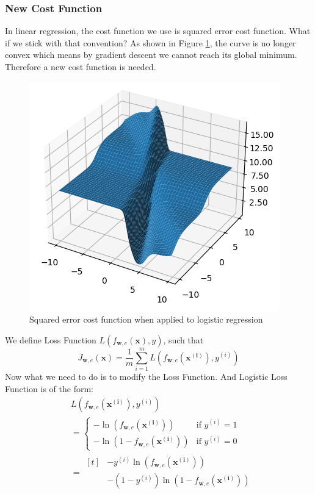 \documentclass[12pt, twoside]{article}
\begin{document}
\begin{multicols*}{2}
		\subsubsection{New Cost Function}
		In linear regression, the cost function we use is squared error cost function. What if we stick with that convention? As shown in Figure \ref{fig:cost-nonconvex}, the curve is no longer convex which means by gradient descent we cannot reach its global minimum. Therefore a new cost function is needed.
		\begin{figure}[H]
			\centering
			\includegraphics[width=\columnwidth]{squared-cost-of-sigmoid}
			\caption{Squared error cost function when applied to logistic regression}
			\label{fig:cost-nonconvex}
		\end{figure}
		We define Loss Function $L(f_{\mathbf{w},e}(\mathbf{x}),y)$, such that
		$$ J_{\mathbf{w},e}(\mathbf{x})=\frac{1}{m}\sum_{i=1}^{m}L(f_{\mathbf{w},e}(\mathbf{x^{(i)}}),y^{(i)}) $$
		Now what we need to do is to modify the Loss Function. And Logistic Loss Function is of the form:
		\begin{align*}
			&L(f_{\mathbf{w},e}(\mathbf{x^{(i)}}),y^{(i)}) \\
			&= \begin{cases}
				-\ln(f_{\mathbf{w},e}(\mathbf{x^{(i)}})) &\text{if }y^{(i)} = 1 \\
				-\ln(1 - f_{\mathbf{w},e}(\mathbf{x^{(i)}})) &\text{if }y^{(i)} = 0
			\end{cases} \\
			&= \begin{aligned}[t]
				&-y^{(i)}\ln(f_{\mathbf{w},e}(\mathbf{x^{(i)}})) \\
				&-(1-y^{(i)})\ln(1 - f_{\mathbf{w},e}(\mathbf{x^{(i)}}))
			\end{aligned}
		\end{align*}
		

\end{multicols*}
\end{document}
